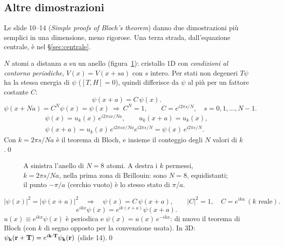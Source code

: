 \documentclass[11pt,a4paper]{article}
\begin{document}
\subsection{Altre dimostrazioni}\label{sec:anello}
Le slide 10--14 (\emph{Simple proofs of Bloch's theorem}) danno due dimostrazioni più semplici in una dimensione, meno rigorose. Una terza strada,
dall'equazione centrale, è nel §\ref{sec:centrale}.

\begin{dimostrazione}
$N$ atomi a distanza $a$ su un anello (figura~\ref{fig:anello}): cristallo 1D con \emph{condizioni al contorno periodiche}, $V(x)=V(x+sa)$ con $s$ intero.
Per stati non degeneri $T\psi$ ha la stessa energia di $\psi$ ($[T,H]=0$), quindi differisce da $\psi$ al più per un fattore costante $C$:
\[
\psi(x+a)=C\,\psi(x).
\]
\[
\psi(x+Na)=C^N\psi(x)=\psi(x)\ \Longrightarrow\ C^N=1,\qquad C=e^{i2\pi s/N},\quad s=0,1,\dots,N-1.
\]
\begin{gather*}
\psi(x)=u_k(x)\,e^{i2\pi sx/Na},\qquad u_k(x+a)=u_k(x),\\
\psi(x+a)=u_k(x)\,e^{i2\pi sx/Na}e^{i2\pi s/N}=\psi(x)\,e^{i2\pi s/N}.
\end{gather*}
Con $k=2\pi s/Na$ è il teorema di Bloch, e insieme il conteggio degli $N$ valori di $k$.\qed
\end{dimostrazione}

\begin{figure}[tbp]
\centering
{}
\caption{A sinistra l'anello di $N=8$ atomi. A destra i $k$ permessi, $k=2\pi s/Na$, nella prima zona di Brillouin: sono $N=8$, equidistanti; il punto
$-\pi/a$ (cerchio vuoto) è lo stesso stato di $\pi/a$.}\label{fig:anello}
\end{figure}

\begin{dimostrazione}
\[
|\psi(x)|^2=|\psi(x+a)|^2\quad\Longrightarrow\quad\psi(x)=C\,\psi(x+a),\qquad|C|^2=1,\quad C=e^{ika}\ (k\text{ reale}).
\]
\[
e^{ikx}\psi(x)=e^{ik(x+a)}\psi(x+a).
\]
$u(x)\equiv e^{ikx}\psi(x)$ è periodica e $\psi(x)=u(x)\,e^{-ikx}$: di nuovo il teorema di Bloch (con $k$ di segno opposto per la convenzione usata). In 3D:
$\psi_{\mathbf k}(\mathbf r+\mathbf T)=e^{i\mathbf k\cdot\mathbf T}\psi_{\mathbf k}(\mathbf r)$ (slide 14).\qed
\end{dimostrazione}
\end{document}
